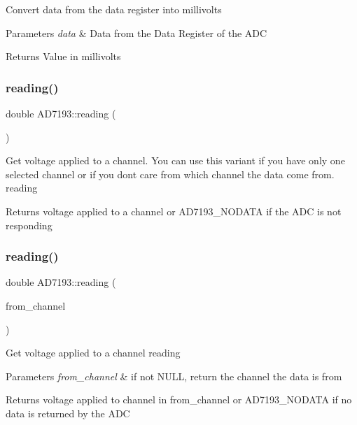 Convert data from the data register into millivolts 
\begin{DoxyParams}{Parameters}
{\em data} & Data from the Data Register of the A\+DC \\
\hline
\end{DoxyParams}
\begin{DoxyReturn}{Returns}
Value in millivolts 
\end{DoxyReturn}
\mbox{\label{classAD7193_ad3630825dd8ecdd7e24ef6e366273a41}} 
\subsubsection{\texorpdfstring{reading()}{reading()}\hspace{0.1cm}{\footnotesize\ttfamily [1/2]}}
{\footnotesize\ttfamily double A\+D7193\+::reading (\begin{DoxyParamCaption}\item[{void}]{ }\end{DoxyParamCaption})}

Get voltage applied to a channel. You can use this variant if you have only one selected channel or if you don\textquotesingle{}t care from which channel the data come from.  reading \begin{DoxyReturn}{Returns}
voltage applied to a channel or A\+D7193\+\_\+\+N\+O\+D\+A\+TA if the A\+DC is not responding 
\end{DoxyReturn}
\mbox{\label{classAD7193_a11dd9bbdd2f74a35495abf8647454786}} 
\subsubsection{\texorpdfstring{reading()}{reading()}\hspace{0.1cm}{\footnotesize\ttfamily [2/2]}}
{\footnotesize\ttfamily double A\+D7193\+::reading (\begin{DoxyParamCaption}\item[{A\+D7193\+::channel\+\_\+t $\ast$}]{from\+\_\+channel }\end{DoxyParamCaption})}

Get voltage applied to a channel  reading 
\begin{DoxyParams}{Parameters}
{\em from\+\_\+channel} & if not N\+U\+LL, return the channel the data is from \\
\hline
\end{DoxyParams}
\begin{DoxyReturn}{Returns}
voltage applied to channel in from\+\_\+channel or A\+D7193\+\_\+\+N\+O\+D\+A\+TA if no data is returned by the A\+DC 
\end{DoxyReturn}
\mbox{\label{classAD7193_adec3aae01cac5bb537a16647b858f196}} 
